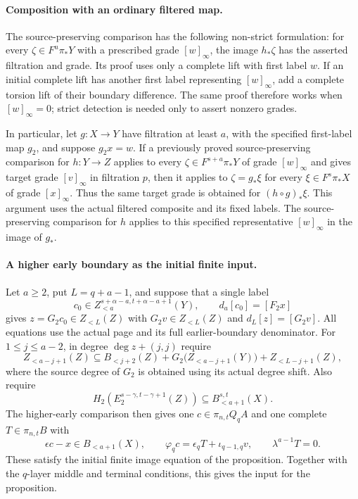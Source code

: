 \paragraph{Composition with an ordinary filtered map.}
The source-preserving comparison has the following non-strict formulation:
for every $\zeta\in F^u\pi_*Y$ with a prescribed grade $[w]_\infty$,
the image $h_*\zeta$ has the asserted filtration and grade. Its proof uses
only a complete lift with first label $w$. If an initial complete lift has
another first label representing $[w]_\infty$, add a complete torsion lift
of their boundary difference. The same proof therefore works when
$[w]_\infty=0$; strict detection is needed only to assert nonzero grades.

In particular, let $g:X\to Y$ have filtration at least $a$, with the
specified first-label map $g_2$, and suppose $g_2x=w$. If a previously
proved source-preserving comparison for $h:Y\to Z$ applies to every
$\zeta\in F^{s+a}\pi_*Y$ of grade $[w]_\infty$ and gives target grade
$[v]_\infty$ in filtration $p$, then it applies to $\zeta=g_*\xi$ for
every $\xi\in F^s\pi_*X$ of grade $[x]_\infty$. Thus the same target
grade is obtained for $(h\circ g)_*\xi$. This argument uses the actual
filtered composite and its fixed labels. The source-preserving comparison for $h$ applies to this specified
representative $[w]_\infty$ in the image of $g_*$.

\paragraph{A higher early boundary as the initial finite input.}
Let $a\geq2$, put $L=q+a-1$, and suppose that a single label
\[
 c_0\in Z_{<a}^{s+\alpha-a,t+\alpha-a+1}(Y),\qquad
 d_a[c_0]=[F_2x]
\]
gives $z=G_2c_0\in Z_{<L}(Z)$ with
$G_2v\in Z_{<L}(Z)$ and $d_L[z]=[G_2v]$.
All equations use the actual page and its full earlier-boundary denominator.
For $1\leq j\leq a-2$, in degree $\deg z+(j,j)$ require
\[
 Z_{<a-j+1}(Z)\subseteq B_{<j+2}(Z)
 +G_2\bigl(Z_{<a-j+1}(Y)\bigr)+Z_{<L-j+1}(Z),
\]
where the source degree of $G_2$ is obtained using its actual degree shift.
Also require
\[
 H_2\!\left(E_2^{s-\gamma,t-\gamma+1}(Z)\right)
 \subseteq B_{<a+1}^{s,t}(X).
\]
The higher-early comparison then gives one
$c\in\pi_{n,t}Q_qA$ and one complete $T\in\pi_{n,t}B$ with
\[
 \epsilon c-x\in B_{<a+1}(X),\qquad
 \varphi_qc=\epsilon_qT+\iota_{q-1,q}v,\qquad
 \lambda^{a-1}T=0.
\]
These satisfy the initial finite image equation of the proposition. Together with the $q$-layer middle and terminal conditions,
this gives the input for the proposition.

